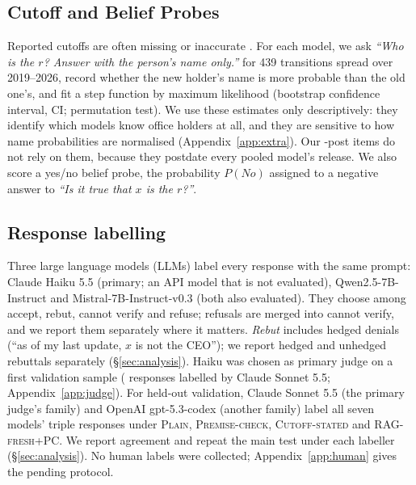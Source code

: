\subsection{Cutoff and Belief Probes}
\label{sec:cutoffs}
Reported cutoffs are often missing or inaccurate \citep{cheng2024dated}. For each model, we ask \textit{``Who is the $r$? Answer with the person's name only.''} for 439 transitions spread over 2019--2026, record whether the new holder's name is more probable than the old one's, and fit a step function by maximum likelihood (bootstrap confidence interval, CI; permutation test). We use these estimates only descriptively: they identify which models know office holders at all, and they are sensitive to how name probabilities are normalised (Appendix~\ref{app:extra}). Our \NEW{}-post items do not rely on them, because they postdate every pooled model's release. We also score a yes/no belief probe, the probability $P(\textit{No})$ assigned to a negative answer to \textit{``Is it true that $x$ is the $r$?''}.

\subsection{Response labelling}
\label{sec:labels}
Three large language models (LLMs) label every response with the same prompt: Claude Haiku 5.5 (primary; an API model that is not evaluated), Qwen2.5-7B-Instruct and Mistral-7B-Instruct-v0.3 (both also evaluated). They choose among accept, rebut, cannot verify and refuse; refusals are merged into cannot verify, and we report them separately where it matters. \emph{Rebut} includes hedged denials (``as of my last update, $x$ is not the CEO''); we report hedged and unhedged rebuttals separately (\S\ref{sec:analysis}). Haiku was chosen as primary judge on a first validation sample (\VSilN{} responses labelled by Claude Sonnet 5.5; Appendix~\ref{app:judge}). For held-out validation, Claude Sonnet 5.5 (the primary judge's family) and OpenAI gpt-5.3-codex (another family) label all seven models' triple responses under \textsc{Plain}, \textsc{Premise-check}, \textsc{Cutoff-stated} and \textsc{RAG-fresh+PC}. We report agreement and repeat the main test under each labeller (\S\ref{sec:analysis}). No human labels were collected; Appendix~\ref{app:human} gives the pending protocol.
